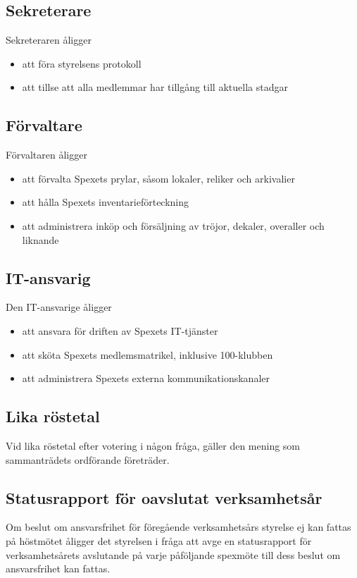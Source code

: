 \documentclass[a4paper]{article}
\begin{document}
\subsection{Sekreterare}
Sekreteraren åligger

\begin{itemize}
  \item att föra styrelsens protokoll
  \item att tillse att alla medlemmar har tillgång till aktuella stadgar
\end{itemize}

\subsection{Förvaltare}
Förvaltaren åligger

\begin{itemize}
  \item att förvalta Spexets prylar, såsom lokaler, reliker och arkivalier
  \item att hålla Spexets inventarieförteckning
  \item att administrera inköp och försäljning av tröjor, dekaler, overaller och liknande
\end{itemize}

\subsection{IT-ansvarig}
Den IT-ansvarige åligger

\begin{itemize}
  \item att ansvara för driften av Spexets IT-tjänster
  \item att sköta Spexets medlemsmatrikel, inklusive 100-klubben
  \item att administrera Spexets externa kommunikationskanaler
\end{itemize}

\subsection{Lika röstetal}
Vid lika röstetal efter votering i någon fråga, gäller den mening som sammanträdets ordförande företräder.

\subsection{Statusrapport för oavslutat verksamhetsår}
Om beslut om ansvarsfrihet för föregående verksamhetsårs styrelse ej kan fattas på höstmötet åligger det styrelsen i fråga att avge en statusrapport för verksamhetsårets avslutande på varje påföljande spexmöte till dess beslut om ansvarsfrihet kan fattas.
\end{document}
